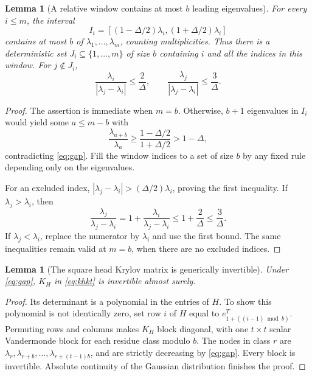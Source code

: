 \documentclass[11pt]{article}
\newtheorem{lemma}[theorem]{Lemma}
\theoremstyle{definition}
\begin{document}
\begin{lemma}[A relative window contains at most $b$ leading eigenvalues]
\label{lem:packing}
For every $i\leq m$, the interval
\begin{equation}
 I_i=[(1-\Delta/2)\lambda_i,(1+\Delta/2)\lambda_i]
 \label{eq:window}
\end{equation}
contains at most $b$ of $\lambda_1,\ldots,\lambda_m$, counting multiplicities.
Thus there is a deterministic set $J_i\subseteq\{1,\ldots,m\}$ of size $b$
containing $i$ and all the indices in this window.
For $j\notin J_i$,
\begin{equation}
 \frac{\lambda_i}{|\lambda_j-\lambda_i|}\leq\frac2\Delta,
 \qquad
 \frac{\lambda_j}{|\lambda_j-\lambda_i|}\leq\frac3\Delta.
 \label{eq:far-ratios}
\end{equation}
\end{lemma}
\begin{proof}
The assertion is immediate when $m=b$. Otherwise, $b+1$ eigenvalues in
$I_i$ would yield some $a\leq m-b$ with
\[
 \frac{\lambda_{a+b}}{\lambda_a}
 \geq\frac{1-\Delta/2}{1+\Delta/2}>1-\Delta,
\]
contradicting \eqref{eq:gap}. Fill the window indices to a set of size $b$
by any fixed rule depending only on the eigenvalues.

For an excluded index, $|\lambda_j-\lambda_i|>(\Delta/2)\lambda_i$, proving
the first inequality. If $\lambda_j>\lambda_i$, then
\[
 \frac{\lambda_j}{\lambda_j-\lambda_i}
 =1+\frac{\lambda_i}{\lambda_j-\lambda_i}
 \leq1+\frac2\Delta\leq\frac3\Delta.
\]
If $\lambda_j<\lambda_i$, replace the numerator by $\lambda_i$ and use the
first bound. The same inequalities remain valid at $m=b$, when there are
no excluded indices.
\end{proof}

\begin{lemma}[The square head Krylov matrix is generically invertible]
\label{lem:generic}
Under \eqref{eq:gap}, $K_H$ in \eqref{eq:khkt} is invertible almost surely.
\end{lemma}
\begin{proof}
Its determinant is a polynomial in the entries of $H$. To show this
polynomial is not identically zero, set row $i$ of $H$ equal to
$e_{1+((i-1)\bmod b)}^T$. Permuting rows and columns makes $K_H$ block diagonal,
with one $t\times t$ scalar Vandermonde block for each residue class modulo
$b$. The nodes in class $r$ are
$\lambda_r,\lambda_{r+b},\ldots,\lambda_{r+(t-1)b}$, and are strictly
decreasing by \eqref{eq:gap}. Every block is invertible. Absolute continuity
of the Gaussian distribution finishes the proof.
\end{proof}
\end{document}
